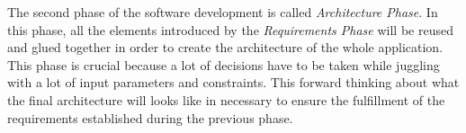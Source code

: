 
The second phase of the software development is called \textit{Architecture Phase}. In this phase, all the elements introduced by the \textit{Requirements Phase} will be reused and glued together in order to create the architecture of the whole application. This phase is crucial because a lot of decisions have to be taken while juggling with a lot of input parameters and constraints. This forward thinking about what the final architecture will looks like in necessary to ensure the fulfillment of the requirements established during the previous phase. \cite[Chapter 17]{bass2013}
